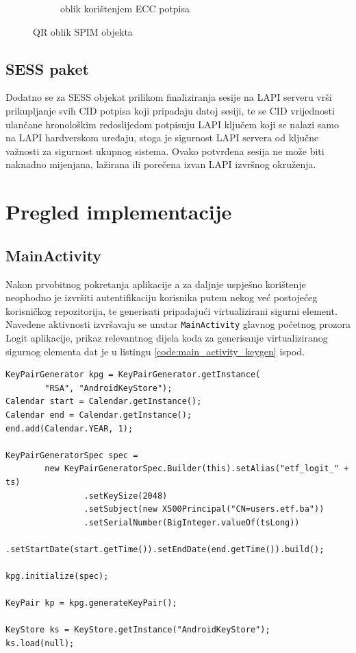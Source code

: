 \begin{figure}[H]
\begin{subfigure}{.5\textwidth}
        \caption{oblik korištenjem ECC potpisa}
        \label{img:qr_ecc}
    \end{subfigure}
    \caption{QR oblik SPIM objekta}%
    \label{img:qr}
\end{figure}

\subsection{SESS paket}
Dodatno se za SESS objekat prilikom finaliziranja sesije na LAPI serveru vrši prikupljanje svih CID potpisa koji pripadaju datoj sesiji, te se CID vrijednosti ulančane hronološkim redoslijedom potpisuju LAPI ključem koji se nalazi samo na LAPI hardverskom uređaju, stoga je sigurnost LAPI servera od ključne važnosti za sigurnost ukupnog sistema. Ovako potvrđena sesija ne može biti naknadno mijenjana, lažirana ili porečena izvan LAPI izvršnog okruženja.

\cleardoublepage
\section{Pregled implementacije}
\subsection{MainActivity}
Nakon prvobitnog pokretanja aplikacije a za daljnje uspješno korištenje neophodno je izvršiti autentifikaciju korisnika putem nekog već postojećeg korisničkog repozitorija, te generisati pripadajući virtualizirani sigurni element. Navedene aktivnosti izvršavaju se unutar \texttt{MainActivity} glavnog početnog prozora Logit aplikacije, prikaz relevantnog dijela koda za generisanje virtualiziranog sigurnog elementa dat je u listingu \ref{code:main_activity_keygen} ispod.

\begin{code}
\begin{verbatim}
KeyPairGenerator kpg = KeyPairGenerator.getInstance(
        "RSA", "AndroidKeyStore");
Calendar start = Calendar.getInstance();
Calendar end = Calendar.getInstance();
end.add(Calendar.YEAR, 1);

KeyPairGeneratorSpec spec =
        new KeyPairGeneratorSpec.Builder(this).setAlias("etf_logit_" + ts)
                .setKeySize(2048)
                .setSubject(new X500Principal("CN=users.etf.ba"))
                .setSerialNumber(BigInteger.valueOf(tsLong))
                .setStartDate(start.getTime()).setEndDate(end.getTime()).build();

kpg.initialize(spec);

KeyPair kp = kpg.generateKeyPair();

KeyStore ks = KeyStore.getInstance("AndroidKeyStore");
ks.load(null);
\end{verbatim}
\label{code:main_activity_keygen}
\end{code}

